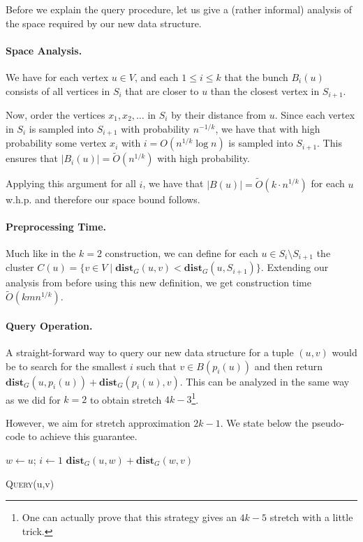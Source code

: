 Before we explain the query procedure, let us give a (rather informal) analysis of the space required by our new data structure.

\paragraph{Space Analysis.} We have for each vertex $u \in V$, and each $1 \leq i \leq k$ that the bunch $B_i(u)$ consists of all vertices in $S_i$ that are closer to $u$ than the closest vertex in $S_{i+1}$. 

Now, order the vertices $x_1, x_2, \dots$ in $S_i$ by their distance from $u$. Since each vertex in $S_i$ is sampled into $S_{i+1}$ with probability $n^{-1/k}$, we have that with high probability some vertex $x_i$ with $i = O(n^{1/k} \log n)$ is sampled into $S_{i+1}$. This ensures that $|B_i(u)| = \tilde{O}(n^{1/k})$ with high probability. 

Applying this argument for all $i$, we have that $|B(u)| = \tilde{O}(k \cdot n^{1/k})$ for each $u$ w.h.p. and therefore our space bound follows.

\paragraph{Preprocessing Time.} Much like in the $k=2$ construction, we can define for each $u \in S_i \setminus S_{i+1}$ the cluster $C(u) = \{ v \in V \;|\; \mathbf{dist}_G(u,v) < \mathbf{dist}_G(u,S_{i+1})\}$. Extending our analysis from before using this new definition, we get construction time $\tilde{O}(kmn^{1/k})$.

\paragraph{Query Operation.} A straight-forward way to query our new data structure for a tuple $(u,v)$ would be to search for the smallest $i$ such that $v \in B(p_i(u))$ and then return $\mathbf{dist}_G(u, p_i(u)) + \mathbf{dist}_G(p_i(u), v)$. This can be analyzed in the same way as we did for $k=2$ to obtain stretch $4k-3$\footnote{One can actually prove that this strategy gives an $4k-5$ stretch with a little trick.}.

However, we aim for stretch approximation $2k-1$. We state below the pseudo-code to achieve this guarantee.

\begin{algorithm}
  \SetAlgoLined
  $w \gets u$; $i \gets 1$\;
  \Return $\mathbf{dist}_G(u,w) + \mathbf{dist}_G(w,v)$
  \caption{\textsc{Query}(u,v)}
\end{algorithm}

